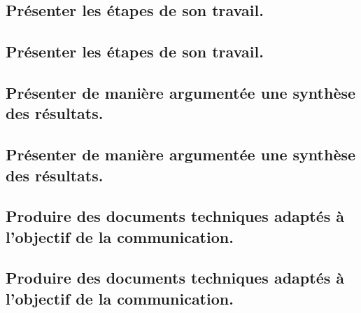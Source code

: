 \documentclass[10pt,fleqn]{book}
\newcommand{\repRel}{../..}
\newcommand{\repStyle}{\repRel/Style}
\newcommand{\td}{fichier_td}
\newcommand{\repExos}{\repRel/ExercicesCompetences}
\newcommand{\repExo}{dossier}
\begin{document}
\subsection{Présenter les étapes de son travail.} 

\subsection{Présenter les étapes de son travail.} 

\subsection{Présenter de manière argumentée une synthèse des résultats.} 

\subsection{Présenter de manière argumentée une synthèse des résultats.} 

\subsection{Produire des documents techniques adaptés à l'objectif de la communication. } 

\subsection{Produire des documents techniques adaptés à l'objectif de la communication. } 

\renewcommand{\repExo}{\repExos/E2_ProduireInformation/E2_05_Dessin2D/1000_Dessin2D}
\renewcommand{\td}{1000_Dessin2D}
\graphicspath{{\repStyle/png/}{\repExo/images/}}


\renewcommand{\repExo}{\repExos/E2_ProduireInformation/E2_05_Dessin2D/1001_Dessin2D}
\renewcommand{\td}{1001_Dessin2D}
\graphicspath{{\repStyle/png/}{\repExo/images/}}


\renewcommand{\repExo}{\repExos/E2_ProduireInformation/E2_05_Dessin2D/1002_Dessin2D}
\renewcommand{\td}{1002_Dessin2D}
\graphicspath{{\repStyle/png/}{\repExo/images/}}


\renewcommand{\repExo}{\repExos/E2_ProduireInformation/E2_05_Dessin2D/1003_Dessin2D}
\renewcommand{\td}{1003_Dessin2D}
\graphicspath{{\repStyle/png/}{\repExo/images/}}


\renewcommand{\repExo}{\repExos/E2_ProduireInformation/E2_05_Dessin2D/1004_Dessin2D}
\renewcommand{\td}{1004_Dessin2D}
\graphicspath{{\repStyle/png/}{\repExo/images/}}

\end{document}
